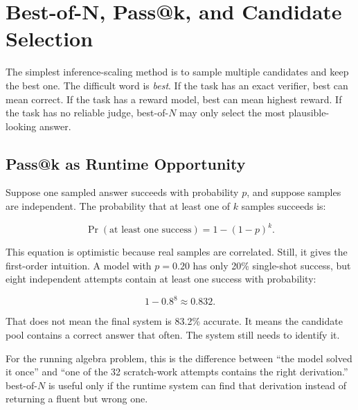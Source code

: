\section{Best-of-N, Pass@k, and Candidate Selection}
\label{sec:ch18-best-of-n}

The simplest inference-scaling method is to sample multiple candidates and keep the best one. The difficult word is \emph{best}. If the task has an exact verifier, best can mean correct. If the task has a reward model, best can mean highest reward. If the task has no reliable judge, best-of-$N$ may only select the most plausible-looking answer.

\subsection{Pass@k as Runtime Opportunity}

Suppose one sampled answer succeeds with probability $p$, and suppose samples are independent. The probability that at least one of $k$ samples succeeds is:

\begin{equation}
  \Pr(\text{at least one success}) = 1 - (1-p)^k.
  \label{eq:passk-runtime}
\end{equation}

This equation is optimistic because real samples are correlated. Still, it gives the first-order intuition. A model with $p=0.20$ has only 20\% single-shot success, but eight independent attempts contain at least one success with probability:

\begin{equation}
  1 - 0.8^8 \approx 0.832.
\end{equation}

That does not mean the final system is 83.2\% accurate. It means the candidate pool contains a correct answer that often. The system still needs to identify it.

For the running algebra problem, this is the difference between ``the model solved it once'' and ``one of the 32 scratch-work attempts contains the right derivation.'' best-of-$N$ is useful only if the runtime system can find that derivation instead of returning a fluent but wrong one.

\noindent{}

